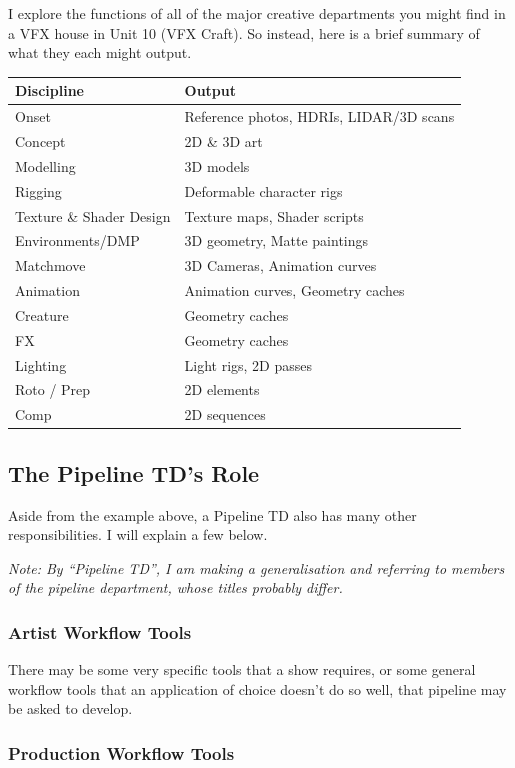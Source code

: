 I explore the functions of all of the major creative departments you might find in a VFX house in Unit 10 (VFX Craft). So instead, here is a brief summary of what they each might output.


\pagebreak

\begin{longtable}[]{@{}ll@{}}
\toprule
Discipline & Output\tabularnewline
\midrule
\endhead
Onset & Reference photos, HDRIs, LIDAR/3D scans\tabularnewline
Concept & 2D \& 3D art\tabularnewline
Modelling & 3D models\tabularnewline
Rigging & Deformable character rigs\tabularnewline
Texture \& Shader Design & Texture maps, Shader scripts\tabularnewline
Environments/DMP & 3D geometry, Matte paintings\tabularnewline
Matchmove & 3D Cameras, Animation curves\tabularnewline
Animation & Animation curves, Geometry caches\tabularnewline
Creature & Geometry caches\tabularnewline
FX & Geometry caches\tabularnewline
Lighting & Light rigs, 2D passes\tabularnewline
Roto / Prep & 2D elements\tabularnewline
Comp & 2D sequences\tabularnewline
\bottomrule
\end{longtable}

\hypertarget{the-pipeline-tds-role}{%
\subsection{The Pipeline TD's Role}\label{the-pipeline-tds-role}}

Aside from the example above, a Pipeline TD also has many other responsibilities. I will explain a few below.

\emph{Note: By ``Pipeline TD'', I am making a generalisation and referring to members of the pipeline department, whose titles probably differ.}

\hypertarget{artist-workflow-tools}{%
\subsubsection{Artist Workflow Tools}\label{artist-workflow-tools}}

There may be some very specific tools that a show requires, or some general workflow tools that an application of choice doesn't do so well, that pipeline may be asked to develop.

\hypertarget{production-workflow-tools}{%
\subsubsection{Production Workflow Tools}\label{production-workflow-tools}}

